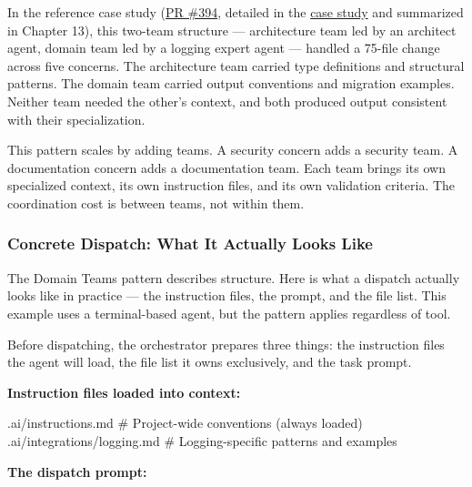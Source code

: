 \documentclass[
  a4paper,
  DIV=11,
  numbers=noendperiod]{scrreprt}
\newenvironment{Shaded}{\begin{snugshade}}{\end{snugshade}}
\newcommand{\NormalTok}[1]{\textcolor[rgb]{0.00,0.23,0.31}{#1}}
\begin{document}
In the reference case study
(\href{https://github.com/microsoft/apm/pull/394}{PR \#394}, detailed in
the \href{../case-study-apm-overhaul.qmd}{case study} and summarized in
Chapter 13), this two-team structure --- architecture team led by an
architect agent, domain team led by a logging expert agent --- handled a
75-file change across five concerns. The architecture team carried type
definitions and structural patterns. The domain team carried output
conventions and migration examples. Neither team needed the other's
context, and both produced output consistent with their specialization.

This pattern scales by adding teams. A security concern adds a security
team. A documentation concern adds a documentation team. Each team
brings its own specialized context, its own instruction files, and its
own validation criteria. The coordination cost is between teams, not
within them.

\subsubsection{Concrete Dispatch: What It Actually Looks
Like}\label{concrete-dispatch-what-it-actually-looks-like}

The Domain Teams pattern describes structure. Here is what a dispatch
actually looks like in practice --- the instruction files, the prompt,
and the file list. This example uses a terminal-based agent, but the
pattern applies regardless of tool.

Before dispatching, the orchestrator prepares three things: the
instruction files the agent will load, the file list it owns
exclusively, and the task prompt.

\textbf{Instruction files loaded into context:}

\begin{Shaded}
\begin{Highlighting}[]
\NormalTok{.ai/instructions.md              \# Project{-}wide conventions (always loaded)}
\NormalTok{.ai/integrations/logging.md      \# Logging{-}specific patterns and examples}
\end{Highlighting}
\end{Shaded}

\textbf{The dispatch prompt:}
\end{document}
